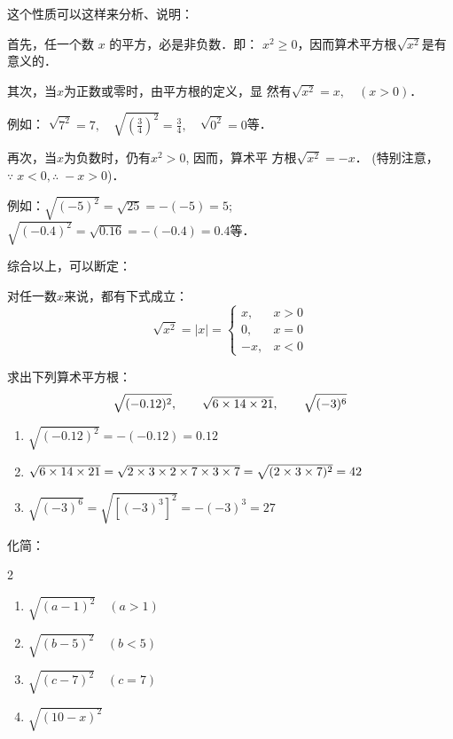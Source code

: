 这个性质可以这样来分析、说明：

首先，任一个数 $x$ 的平方，必是非负数．即：
$x^2\ge 0$，因而算术平方根$\sqrt{x^2}$是有意义的．

其次，当$x$为正数或零时，由平方根的定义，显
然有$\sqrt{x^2}=x,\quad (x>0)$．

例如：
$\sqrt{7^2}=7,\quad\sqrt{\left(\frac{3}{4}\right)^2}=\frac{3}{4},\quad \sqrt{0^2}=0$等．


再次，当$x$为负数时，仍有$x^2>0$, 因而，算术平
方根$\sqrt{x^2}=-x$． (特别注意，$\because\; x<0, \therefore\; -x>0$)．

例如：$\sqrt{(-5)^2}=\sqrt{25}=-(-5)=5$; 
$\sqrt{(-0.4)^2}=\sqrt{0.16}=-(-0.4)=0.4$等．

综合以上，可以断定：

对任一数$x$来说，都有下式成立：
\[\sqrt{x^2}=|x|=\begin{cases}
    x,& x>0\\
    0, &x=0\\
    -x, & x<0
\end{cases}\]


\begin{example}
    求出下列算术平方根：
\[ \sqrt{(-0.12)^2},\qquad \sqrt{6\times 14\times 21},\qquad \sqrt{(-3)^6} \]
\end{example}

\begin{solution}
\begin{enumerate}
    \item $ \sqrt{(-0.12)^2}=-(-0.12)=0.12$
    \item $\sqrt{6\times 14\times 21}=\sqrt{2\times3\times2\times7\times3\times7}=\sqrt{(2\times3\times7)^2}=42$
    \item $\sqrt{(-3)^6}=\sqrt{[(-3)^3]^2}=-(-3)^3=27$
\end{enumerate}
\end{solution}

\begin{example}
    化简：
\begin{multicols}{2}
\begin{enumerate}
    \item $\sqrt{(a-1)^{2}}\quad (a>1)$
    \item $\sqrt{(b-5)^{2}}\quad (b<5)$
    \item $\sqrt{(c-7)^{2}}\quad (c=7)$
    \item $\sqrt{(10-x)^{2}}$
\end{enumerate}
\end{multicols}
\end{example}

